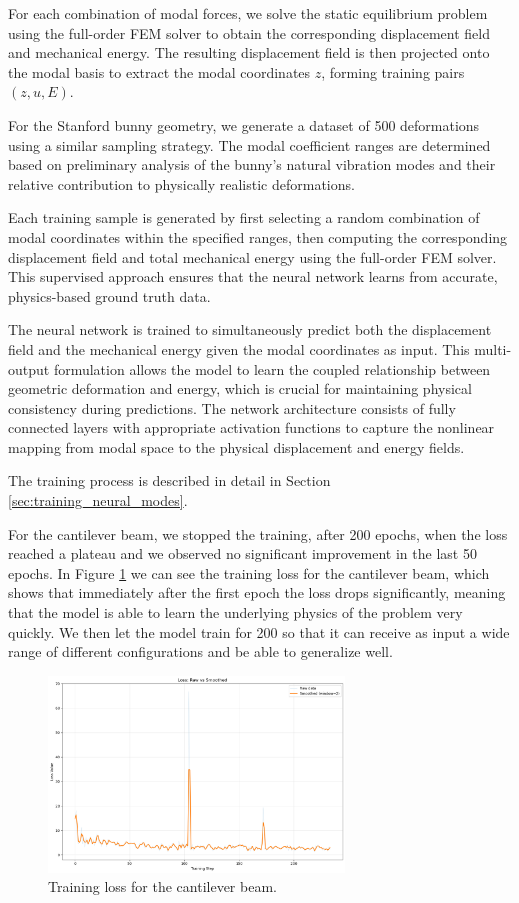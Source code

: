 For each combination of modal forces, we solve the static equilibrium problem using the full-order FEM solver to obtain the corresponding displacement field and mechanical energy. The resulting displacement field is then projected onto the modal basis to extract the modal coordinates $z$, forming training pairs $(z, u, E)$.

For the Stanford bunny geometry, we generate a dataset of 500 deformations using a similar sampling strategy. The modal coefficient ranges are determined based on preliminary analysis of the bunny's natural vibration modes and their relative contribution to physically realistic deformations.

Each training sample is generated by first selecting a random combination of modal coordinates within the specified ranges, then computing the corresponding displacement field and total mechanical energy using the full-order FEM solver. This supervised approach ensures that the neural network learns from accurate, physics-based ground truth data.

The neural network is trained to simultaneously predict both the displacement field and the mechanical energy given the modal coordinates as input. This multi-output formulation allows the model to learn the coupled relationship between geometric deformation and energy, which is crucial for maintaining physical consistency during predictions. The network architecture consists of fully connected layers with appropriate activation functions to capture the nonlinear mapping from modal space to the physical displacement and energy fields.

The training process is described in detail in Section \ref{sec:training_neural_modes}.

For the cantilever beam, we stopped the training, after 200 epochs, when the loss reached a plateau and we observed no significant improvement in the last 50 epochs. In Figure \ref{fig:training_loss_beam} we can see the training loss for the cantilever beam, which shows that immediately after the first epoch the loss drops significantly, meaning that the model is able to learn the underlying physics of the problem very quickly. We then let the model train for 200 so that it can receive as input a wide range of different configurations and be able to generalize well.

\begin{figure}[ht]
    \centering
    \includegraphics[width=0.7\textwidth]{Images/training_loss_smoothed.png}
    \caption{Training loss for the cantilever beam.}
    \label{fig:training_loss_beam}
\end{figure}

